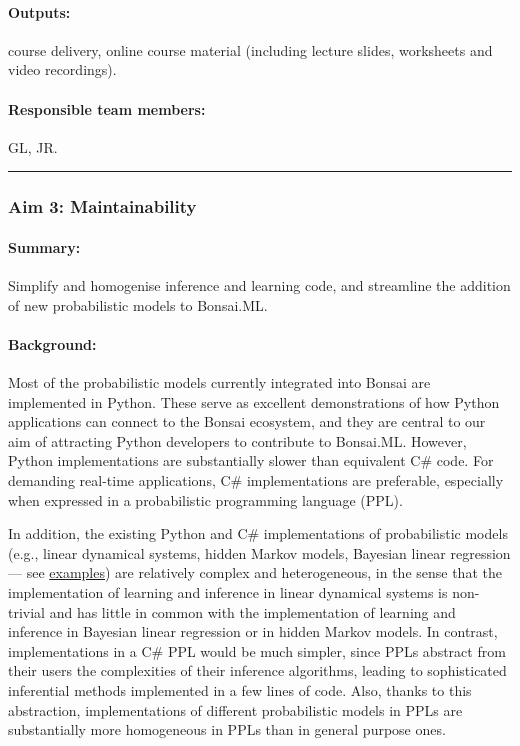 \paragraph{Outputs:} course delivery, online course material (including lecture
slides, worksheets and video recordings).

\paragraph{Responsible team members:} GL, JR.

\noindent\rule{\textwidth}{1pt}
\subsubsection{Aim 3: Maintainability}

\paragraph{Summary:} Simplify and homogenise inference and learning code, and streamline the addition of new probabilistic models to Bonsai.ML.

\paragraph{Background:} Most of the probabilistic models currently integrated
into Bonsai are implemented in Python. These serve as excellent demonstrations
of how Python applications can connect to the Bonsai ecosystem, and they are
central to our aim of attracting Python developers to contribute to Bonsai.ML.
%
However, Python implementations are substantially slower than equivalent C\#
code. For demanding real-time applications, C\# implementations are preferable,
especially when expressed in a probabilistic programming language (PPL).

In addition, the existing Python and C\# implementations of probabilistic
models (e.g., linear dynamical systems, hidden Markov models, Bayesian linear
regression — see
\href{https://bonsai-rx.org/machinelearning/examples/README.html}{examples})
are relatively complex and heterogeneous, in the sense that the implementation
of learning and inference in linear dynamical systems is non-trivial and has
little in common with the implementation of learning and inference in Bayesian
linear regression or in hidden Markov models.
%
In contrast, implementations in a C\# PPL would be much simpler, since PPLs
abstract from their users the complexities of their inference algorithms,
leading to sophisticated inferential methods implemented in a few lines of
code.
%
Also, thanks to this abstraction, implementations of different probabilistic
models in PPLs are substantially more homogeneous in PPLs than in general
purpose ones.

